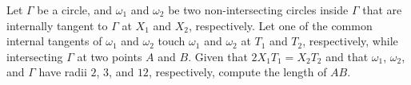 Let $\Gamma$ be a circle, and $\omega_1$ and $\omega_2$ be two non-intersecting circles inside $\Gamma$ that are internally tangent to $\Gamma$ at $X_1$ and $X_2$, respectively. Let one of the common internal tangents of $\omega_1$ and $\omega_2$ touch $\omega_1$ and $\omega_2$ at $T_1$ and $T_2$, respectively, while intersecting $\Gamma$ at two points $A$ and $B$. Given that $2X_1T_1=X_2T_2$ and that $\omega_1$, $\omega_2$, and $\Gamma$ have radii $2$, $3$, and $12$, respectively, compute the length of $AB$.

